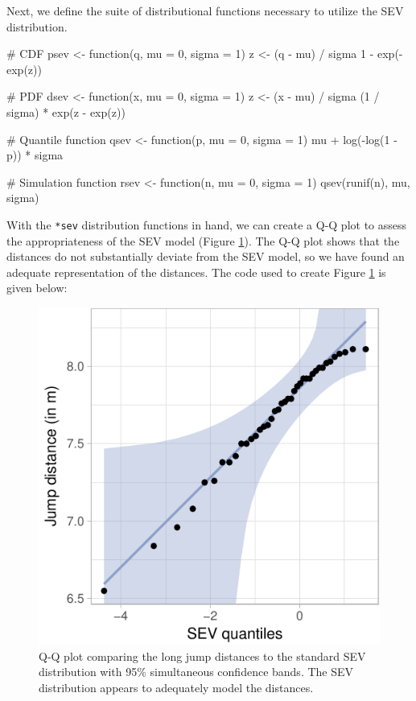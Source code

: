 Next, we define the suite of distributional functions necessary to
utilize the SEV distribution.

\begin{Schunk}
\begin{Sinput}
# CDF
psev <- function(q, mu = 0, sigma = 1) {
  z <- (q - mu) / sigma
  1 - exp(-exp(z))
}

# PDF
dsev <- function(x, mu = 0, sigma = 1) {
  z <- (x - mu) / sigma
  (1 / sigma) * exp(z - exp(z))
}

# Quantile function
qsev <- function(p, mu = 0, sigma = 1) {
  mu + log(-log(1 - p)) * sigma
}

# Simulation function
rsev <- function(n, mu = 0, sigma = 1) {
  qsev(runif(n), mu, sigma)
}
\end{Sinput}
\end{Schunk}

With the \texttt{*sev} distribution functions in hand, we can create a
Q-Q plot to assess the appropriateness of the SEV model (Figure
\ref{fig:sev-qq}). The Q-Q plot shows that the distances do not
substantially deviate from the SEV model, so we have found an adequate
representation of the distances. The code used to create Figure
\ref{fig:sev-qq} is given below:

\begin{Schunk}
\begin{figure}

{\centering \includegraphics[width=0.45\linewidth]{loy-figures/sev-qq-1} 

}

\caption[Q-Q plot comparing the long jump distances to the standard SEV distribution with 95\% simultaneous confidence bands]{Q-Q plot comparing the long jump distances to the standard SEV distribution with 95\% simultaneous confidence bands. The SEV distribution appears to adequately model the distances.}\label{fig:sev-qq}
\end{figure}
\end{Schunk}

